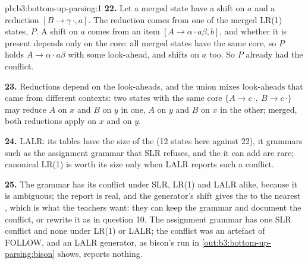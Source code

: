 \begin{solution}{pb:b3:bottom-up-parsing:1}
\textbf{22.} Let a merged state have a shift on $a$ and a reduction $[B \to \gamma\,\cdot, a]$. The reduction comes from one of the merged LR(1) states, $P$. A shift on $a$ comes from an item $[A \to \alpha \cdot a\beta, b]$, and whether it is present depends only on the core: all merged states have the same core, so $P$ holds $A \to \alpha \cdot a\beta$ with some look-ahead, and shifts on $a$ too. So $P$ already had the conflict.

\textbf{23.} Reductions depend on the look-aheads, and the union mixes look-aheads that came from different contexts: two states with the same core $\{A \to c\,\cdot,\ B \to c\,\cdot\}$ may reduce $A$ on $x$ and $B$ on $y$ in one, $A$ on $y$ and $B$ on $x$ in the other; merged, both reductions apply on $x$ and on $y$.

\textbf{24.} LALR: its tables have the size of the  (12 states here against 22), it  grammars such as the assignment grammar that SLR refuses, and the  it can add are rare; canonical LR(1) is worth its size only when LALR reports such a conflict.

\textbf{25.} The  grammar has its conflict under SLR, LR(1) and LALR alike, because it is ambiguous; the report is real, and the generator's shift gives the  to the nearest , which is what the teachers want: they can keep the grammar and document the conflict, or rewrite it as in question 10. The assignment grammar has one SLR conflict and none under LR(1) or LALR; the conflict was an artefact of FOLLOW, and an LALR generator, as bison's run in \cref{out:b3:bottom-up-parsing:bison} shows, reports nothing.
\end{solution}
